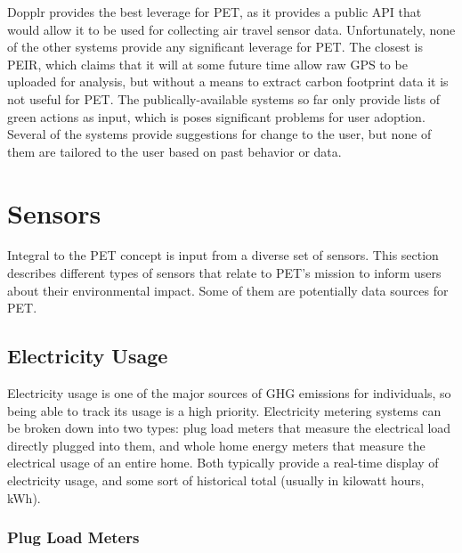 Dopplr provides the best leverage for PET, as it provides a public API that would allow it to be used for collecting air travel sensor data. Unfortunately, none of the other systems provide any significant leverage for PET. The closest is PEIR, which claims that it will at some future time allow raw GPS to be uploaded for analysis, but without a means to extract carbon footprint data it is not useful for PET. The publically-available systems so far only provide lists of green actions as input, which is poses significant problems for user adoption. Several of the systems provide suggestions for change to the user, but none of them are tailored to the user based on past behavior or data.


\section{Sensors}
\label{sensor-section}

Integral to the PET concept is input from a diverse set of sensors. This section describes different types of sensors that relate to PET's mission to inform users about their environmental impact. Some of them are potentially data sources for PET.

\subsection{Electricity Usage}

Electricity usage is one of the major sources of GHG emissions for individuals, so being able to track its usage is a high priority. Electricity metering systems can be broken down into two types: plug load meters that measure the electrical load directly plugged into them, and whole home energy meters that measure the electrical usage of an entire home. Both typically provide a real-time display of electricity usage, and some sort of historical total (usually in kilowatt hours, kWh).

\subsubsection{Plug Load Meters}
\label{plug-load-meters}


